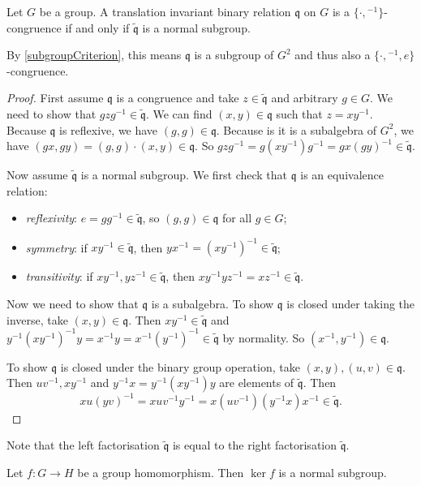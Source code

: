 \begin{proposition} \label{congruenceNormalSubgroup}
Let $G$ be a group.
A translation invariant binary relation $\mathfrak{q}$ on $G$ is a $\{\cdot, {}^{-1}\}$-congruence \textup{if and only if} $\widetilde{\mathfrak{q}}$ is a normal subgroup.
\end{proposition}
By \ref{subgroupCriterion}, this means $\mathfrak{q}$ is a subgroup of $G^2$ and thus also a $\{\cdot, {}^{-1}, e\}$-congruence.
\begin{proof}
First assume $\mathfrak{q}$ is a congruence and take $z\in\widetilde{\mathfrak{q}}$ and arbitrary $g\in G$. We need to show that $gzg^{-1}\in \widetilde{\mathfrak{q}}$. We can find $(x,y)\in \mathfrak{q}$ such that $z = xy^{-1}$. Because $\mathfrak{q}$ is reflexive, we have $(g,g)\in\mathfrak{q}$. Because is it is a subalgebra of $G^2$, we have $(gx,gy) = (g,g)\cdot (x,y)\in \mathfrak{q}$. So $gzg^{-1} = g(xy^{-1})g^{-1} = gx(gy)^{-1} \in \widetilde{\mathfrak{q}}$.

Now assume $\widetilde{\mathfrak{q}}$ is a normal subgroup. We first check that $\mathfrak{q}$ is an equivalence relation:
\begin{itemize}
\item \emph{reflexivity}: $e = gg^{-1}\in \widetilde{\mathfrak{q}}$, so $(g,g)\in\mathfrak{q}$ for all $g\in G$;
\item \emph{symmetry}: if $xy^{-1}\in \widetilde{\mathfrak{q}}$, then $yx^{-1} = (xy^{-1})^{-1}\in \widetilde{\mathfrak{q}}$;
\item \emph{transitivity}: if $xy^{-1}, yz^{-1}\in \widetilde{\mathfrak{q}}$, then $xy^{-1}yz^{-1} = xz^{-1}\in \widetilde{\mathfrak{q}}$.
\end{itemize}
Now we need to show that $\mathfrak{q}$ is a subalgebra. To show $\mathfrak{q}$ is closed under taking the inverse, take $(x,y) \in \mathfrak{q}$. Then $xy^{-1}\in \widetilde{\mathfrak{q}}$ and $y^{-1}(xy^{-1})^{-1}y = x^{-1}y = x^{-1}(y^{-1})^{-1} \in \widetilde{\mathfrak{q}}$ by normality. So $(x^{-1}, y^{-1}) \in \mathfrak{q}$.

To show $\mathfrak{q}$ is closed under the binary group operation, take $(x,y),(u,v)\in\mathfrak{q}$. Then $uv^{-1}, xy^{-1}$ and $y^{-1}x = y^{-1}(xy^{-1})y$ are elements of $\widetilde{\mathfrak{q}}$. Then
\[ xu(yv)^{-1} = xuv^{-1}y^{-1} = x(uv^{-1})(y^{-1}x)x^{-1} \in \widetilde{\mathfrak{q}}. \]
\end{proof}
Note that the left factorisation $\widetilde{\mathfrak{q}}$ is equal to the right factorisation $\widetilde{\mathfrak{q}}$.
\begin{corollary} \label{kernelNormalSubgroup}
Let $f: G\to H$ be a group homomorphism. Then $\ker f$ is a normal subgroup.
\end{corollary}

